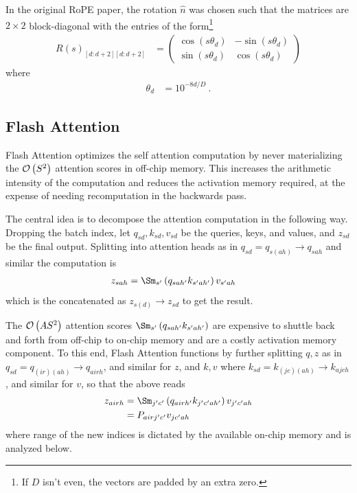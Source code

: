 \documentclass[11pt]{article}
\begin{document}
In the original RoPE paper, the rotation $ \hat{n} $ was chosen such that the matrices are $ 2
	\times  2 $ block-diagonal with the entries of the form\footnote{If $ D $ isn't even, the vectors
	are padded by an extra zero.}
\begin{align}
	R(s)_{ [d:d+2][d:d+2] } & =\begin{pmatrix}
		                           \cos \left ( s \theta _{ d }   \right ) & -\sin \left ( s \theta _{ d }   \right ) \\
		                           \sin \left ( s \theta _{ d }   \right ) & \cos \left ( s \theta _{ d }   \right )
	                           \end{pmatrix}
\end{align}
where
\begin{align}
	\theta _{ d } & = 10 ^{ -8d/D   } \ .
\end{align}


\subsection{Flash Attention \label{subsec_flash_attention}}


Flash Attention \cite{dao2022flashattention, dao2023flashattention2} optimizes the self attention
computation by never materializing the $ \mathcal{O} \left( S ^{ 2 } \right)  $ attention scores in
off-chip memory. This increases the arithmetic intensity of the computation and reduces the
activation memory required, at the expense of needing recomputation in the backwards pass.


The central idea is to decompose the attention computation in the following way. Dropping the batch
index, let $ q _{ sd }, k _{ sd }, v _{ sd } $ be the queries, keys, and values, and $ z _{ sd } $
be the final output. Splitting into attention heads as in $ q _{ sd } = q _{ s(ah) }\longrightarrow q _{ sah } $
and similar the computation is
\begin{align}
    z _{ sah } &= \Sm _{ s' } \left ( q _{ sah' } k _{ s'ah' } \right ) v _{ s'ah }
\end{align}
which is the concatenated as $ z _{ s(d) }\longrightarrow  z _{ sd } $ to get the result.

The $ \mathcal{O} \left( A S ^{ 2 } \right)  $ attention scores $ \Sm _{ s' } \left ( q _{ sah' } k _{
s'ah' } \right ) $ are expensive to shuttle back and forth from off-chip to on-chip memory and are a
costly activation memory component. To this end, Flash Attention functions by further splitting $ q,
z $ as in $ q _{ sd }= q _{ (ir)(ah) }\longrightarrow  q _{ airh }  $, and similar for $ z $, and $ k,v
$ where $ k _{ sd }= k _{ (jc)(ah) }\longrightarrow  k _{ ajch }  $, and similar for $ v $, so that
the above reads
\begin{align}
    z _{ airh } &= \Sm _{ j'c' } \left ( q _{ airh' } k _{ j'c'ah' } \right ) v _{ j'c'ah } \nn
     &= P _{ airj'c' } v _{ jc'ah }
\end{align}
where range of the new indices is dictated by the available on-chip memory and is analyzed below.
\end{document}
